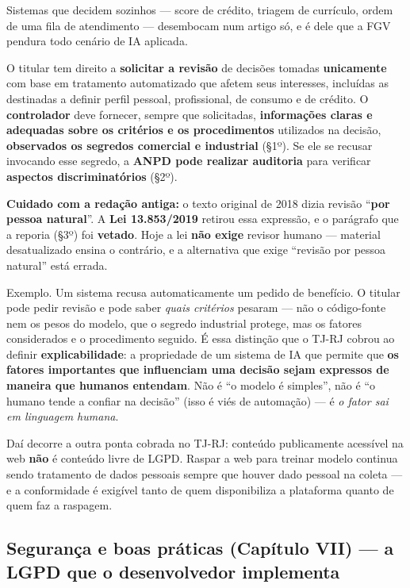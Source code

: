Sistemas que decidem sozinhos --- score de crédito, triagem de currículo,
ordem de uma fila de atendimento --- desembocam num artigo só, e é dele que a
FGV pendura todo cenário de IA aplicada.

\begin{conceito}
O titular tem direito a \textbf{solicitar a revisão} de decisões tomadas
\textbf{unicamente} com base em tratamento automatizado que afetem seus
interesses, incluídas as destinadas a definir perfil pessoal, profissional, de
consumo e de crédito. O \textbf{controlador} deve fornecer, sempre que
solicitadas, \textbf{informações claras e adequadas sobre os critérios e os
procedimentos} utilizados na decisão, \textbf{observados os segredos comercial
e industrial} (§1º). Se ele se recusar invocando esse segredo, a \textbf{ANPD
pode realizar auditoria} para verificar \textbf{aspectos discriminatórios}
(§2º).

\textbf{Cuidado com a redação antiga:} o texto original de 2018 dizia revisão
``\textbf{por pessoa natural}''. A \textbf{Lei 13.853/2019} retirou essa
expressão, e o parágrafo que a reporia (§3º) foi \textbf{vetado}. Hoje a lei
\textbf{não exige} revisor humano --- material desatualizado ensina o
contrário, e a alternativa que exige ``revisão por pessoa natural'' está
errada.
\end{conceito}

Exemplo. Um sistema recusa automaticamente um pedido de benefício. O titular
pode pedir revisão e pode saber \emph{quais critérios} pesaram --- não o
código-fonte nem os pesos do modelo, que o segredo industrial protege, mas os
fatores considerados e o procedimento seguido. É essa distinção que o TJ-RJ
cobrou ao definir \textbf{explicabilidade}: a propriedade de um sistema de IA
que permite que \textbf{os fatores importantes que influenciam uma decisão
sejam expressos de maneira que humanos entendam}. Não é ``o modelo é
simples'', não é ``o humano tende a confiar na decisão'' (isso é viés de
automação) --- é \emph{o fator sai em linguagem humana}.

Daí decorre a outra ponta cobrada no TJ-RJ: conteúdo publicamente acessível na
web \textbf{não} é conteúdo livre de LGPD. Raspar a web para treinar modelo
continua sendo tratamento de dados pessoais sempre que houver dado pessoal na
coleta --- e a conformidade é exigível tanto de quem disponibiliza a
plataforma quanto de quem faz a raspagem.

\subsection{Segurança e boas práticas (Capítulo VII) --- a LGPD que o desenvolvedor implementa}

